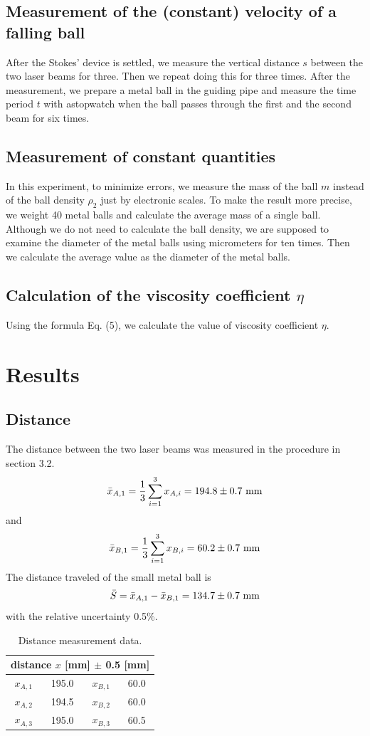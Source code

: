\documentclass[a4paper]{report}
\begin{document}
	\subsection{Measurement of the (constant) velocity of a falling ball}
	After the Stokes' device is settled, we measure the vertical distance $s$ between the two laser beams for three. Then we repeat doing this for three times. After the measurement, we prepare a metal ball in the guiding pipe and measure the time period $t$ with astopwatch when the ball passes through the first and the second beam for six times.
	\subsection{Measurement of constant quantities}
	In this experiment, to minimize errors, we measure the mass of the ball $m$ instead of the ball density $\rho_2$ just by electronic scales. To make the result more precise, we weight 40 metal balls and calculate the average mass of a single ball. Although we do not need to calculate the ball density, we are supposed to examine the diameter of the metal balls using micrometers for ten times. Then we calculate the average value as the diameter of the metal balls.
	\subsection{Calculation of the viscosity coefficient $\eta$}
	Using the formula Eq. (5), we calculate the value of viscosity coefficient $\eta$.
	\section{Results}
	\subsection{Distance}
	The distance between the two laser beams was measured in the procedure in section 3.2.
	\begin{equation*}
	\bar{x}_{A,1}=\dfrac{1}{3}\sum_{i=1}^{3}x_{A,i}=194.8\pm0.7\ \rm{mm}
	\end{equation*}
	and
	\begin{equation*}
	\bar{x}_{B,1}=\dfrac{1}{3}\sum_{i=1}^{3}x_{B,i}=60.2\pm0.7\ \rm{mm}
	\end{equation*}
	The distance traveled of the small metal ball is
	\begin{equation*}
	\bar{S}=\bar{x}_{A,1}-\bar{x}_{B,1}=134.7\pm0.7\ \rm{mm}
	\end{equation*}
	with the relative uncertainty 0.5\%.
	\begin{table}[H]
		\centering
		\begin{tabular}{|c|c|c|c|}
			\hline
			\multicolumn{4}{|c|}{distance $x$ [mm] $\pm$ 0.5 [mm]}\\
			\hline
			$x_{A,1}$&195.0&$x_{B,1}$&60.0\\
			\hline
			$x_{A,2}$&194.5&$x_{B,2}$&60.0\\
			\hline
			$x_{A,3}$&195.0&$x_{B,3}$&60.5\\
			\hline
		\end{tabular}
		\caption{Distance measurement data.}
	\end{table}
\end{document}
